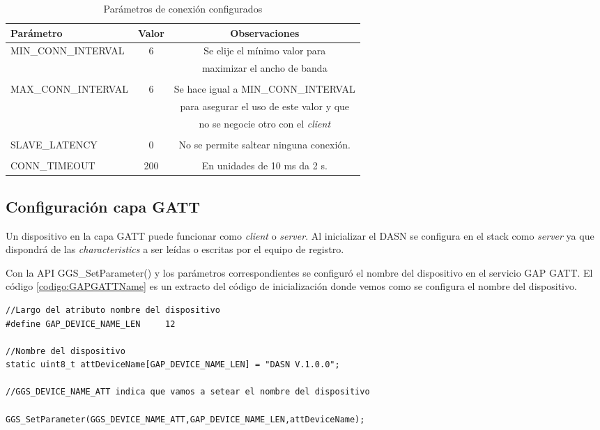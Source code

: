 \begin{table}[h]
\centering
\caption[Parámetros de conexión configurados]{Parámetros de conexión configurados}
\begin{tabular}{l c c}
\toprule
\textbf{Parámetro} & \textbf{Valor} & \textbf{Observaciones}\\
\midrule
MIN\_CONN\_INTERVAL & 6   & Se elije el mínimo valor para\\ 
                    &     & maximizar el ancho de banda\\
                    &     & \\
MAX\_CONN\_INTERVAL & 6   & Se hace igual a MIN\_CONN\_INTERVAL  \\
                    &     & para asegurar  el uso de este valor y que \\
                    &     & no se negocie otro con el \textit{client}\\
                    &     & \\ 
SLAVE\_LATENCY      & 0   & No se permite saltear ninguna conexión. \\
                    &     & \\
CONN\_TIMEOUT       & 200 & En unidades de 10 ms da 2 s. \\

\bottomrule
\hline
\end{tabular}
\label{tab:ParametrosConexion}
\end{table}

\subsection{Configuración capa GATT}
Un dispositivo en la capa GATT puede funcionar como \textit{client} o \textit{server}. Al inicializar el DASN se configura en el stack como \textit{server} ya que dispondrá de las \textit{characteristics} a ser leídas o escritas por el equipo de registro.

Con la API GGS\_SetParameter() y los parámetros correspondientes se configuró el nombre del dispositivo en el servicio GAP GATT. El código \ref{codigo:GAPGATTName} es un extracto del código de inicialización donde vemos como se configura el nombre del dispositivo.

\begin{lstlisting}[caption= Configuración nombre del dispositivo, label=codigo:GAPGATTName]
//Largo del atributo nombre del dispositivo
#define GAP_DEVICE_NAME_LEN		12

//Nombre del dispositivo
static uint8_t attDeviceName[GAP_DEVICE_NAME_LEN] = "DASN V.1.0.0";

//GGS_DEVICE_NAME_ATT indica que vamos a setear el nombre del dispositivo

GGS_SetParameter(GGS_DEVICE_NAME_ATT,GAP_DEVICE_NAME_LEN,attDeviceName);
\end{lstlisting}

